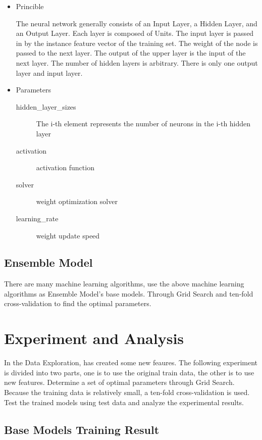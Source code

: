 \begin{itemize}
	\item Princible
	
	The neural network generally consists of 
	an Input Layer, a Hidden Layer, and an Output Layer. 
	Each layer is composed of Units. 
	The input layer is passed in by 
	the instance feature vector of the training set. 
	The weight of the node is passed to the next layer. 
	The output of the upper layer is 
	the input of the next layer. 
	The number of hidden layers is arbitrary. 
	There is only one output layer and input layer.
	
	\item Parameters
	
	\begin{description}
		\item[hidden_layer_sizes] The i-th element represents 
		the number of neurons in the i-th hidden layer
		\item[activation] activation function
		\item[solver] weight optimization solver
		\item[learning_rate] weight update speed
	\end{description}
\end{itemize}

\subsection{Ensemble Model}

There are many machine learning algorithms, 
use the above machine learning algorithms 
as Ensemble Model’s base models. 
Through Grid Search and
ten-fold cross-validation
to find the optimal parameters.

\section{Experiment and Analysis}

In the Data Exploration, 
has created some new feaures.
The following experiment is divided into two parts,
one is to use the original train data, 
the other is to use new features.
Determine a set of optimal parameters 
through Grid Search. 
Because the training data is relatively small, 
a ten-fold cross-validation is used. 
Test the trained models using test data and 
analyze the experimental results.

\subsection{Base Models Training Result}

